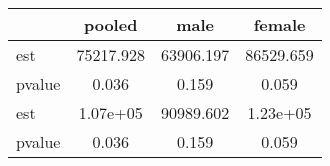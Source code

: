 \begin{table}[htbp]
\begin{tabular}{lccc} \hline \hline
 & pooled  & male  & female  \\  \hline 
est & 75217.928 & 63906.197 & 86529.659 \\  
pvalue &     0.036 &     0.159 &     0.059 \\  
est &  1.07e+05 & 90989.602 &  1.23e+05 \\  
pvalue &     0.036 &     0.159 &     0.059 \\  
\hline \hline \end{tabular}
\end{table}
